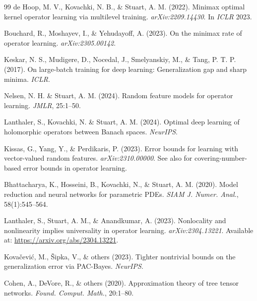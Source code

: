 \documentclass[12pt,a4paper]{article}
\begin{document}
\begin{thebibliography}{99}
     de Hoop, M. V., Kovachki, N. B., \& Stuart, A. M. (2022). Minimax optimal kernel operator learning via multilevel training. \textit{arXiv:2209.14430}. In \textit{ICLR} 2023.

     Bouchard, R., Moshayev, I., \& Yehudayoff, A. (2023). On the minimax rate of operator learning. \textit{arXiv:2305.00142}.

     Keskar, N. S., Mudigere, D., Nocedal, J., Smelyanskiy, M., \& Tang, P. T. P. (2017). On large-batch training for deep learning: Generalization gap and sharp minima. \textit{ICLR}.

     Nelsen, N. H. \& Stuart, A. M. (2024). Random feature models for operator learning. \textit{JMLR}, 25:1--50.

     Lanthaler, S., Kovachki, N. \& Stuart, A. M. (2024). Optimal deep learning of holomorphic operators between Banach spaces. \textit{NeurIPS}.

     Kissas, G., Yang, Y., \& Perdikaris, P. (2023). Error bounds for learning with vector-valued random features. \textit{arXiv:2310.00000}. See also \citet{kissas2023operator} for covering-number-based error bounds in operator learning.

     Bhattacharya, K., Hosseini, B., Kovachki, N., \& Stuart, A. M. (2020). Model reduction and neural networks for parametric PDEs. \textit{SIAM J. Numer. Anal.}, 58(1):545--564.

     Lanthaler, S., Stuart, A. M., \& Anandkumar, A. (2023). Nonlocality and nonlinearity implies universality in operator learning. \textit{arXiv:2304.13221}. Available at: \url{https://arxiv.org/abs/2304.13221}.

     Kovačević, M., Šipka, V., \& others (2023). Tighter nontrivial bounds on the generalization error via PAC-Bayes. \textit{NeurIPS}.

     Cohen, A., DeVore, R., \& others (2020). Approximation theory of tree tensor networks. \textit{Found. Comput. Math.}, 20:1--80.


\end{thebibliography}
\end{document}
